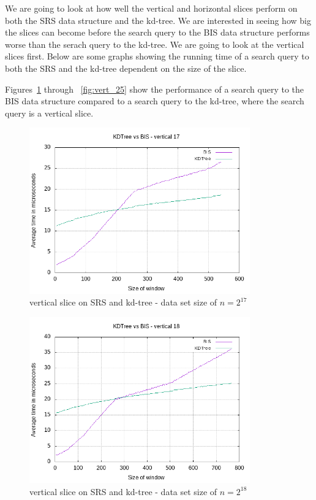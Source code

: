 We are going to look at how well the vertical and horizontal slices perform on both the SRS data structure and the kd-tree. We are interested in seeing how big the slices can become before the search query to the BIS data structure performs worse than the serach query to the kd-tree. We are going to look at the vertical slices first. Below are some graphs showing the running time of a search query to both the SRS and the kd-tree dependent on the size of the slice. 

Figures~\ref{fig:vert_17} through ~\ref{fig:vert_25} show the performance of a search query to the BIS data structure compared to a search query to the kd-tree, where the search query is a vertical slice.


\begin{figure}[h]
    \centering
    \includegraphics[width = 0.85\textwidth]{pictures/analysis/vert_17.png}
    \caption{vertical slice on SRS and kd-tree - data set size of $n=2^{17}$}\label{fig:vert_17}
\end{figure}

\begin{figure}[h]
    \centering
    \includegraphics[width = 0.85\textwidth]{pictures/analysis/vert_18.png}
    \caption{vertical slice on SRS and kd-tree - data set size of $n=2^{18}$}\label{fig:vert_18}
\end{figure}

